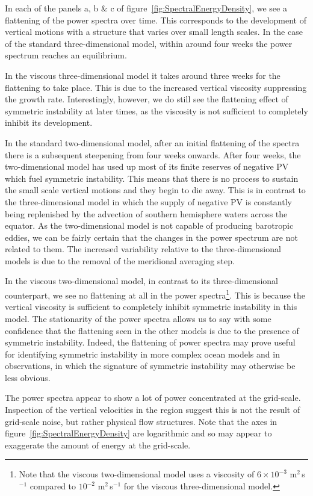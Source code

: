     In each of the panels a, b \& c of figure~\ref{fig:SpectralEnergyDensity}, we see a flattening of the power spectra over time. This corresponds to the development of vertical motions with a structure that varies over small length scales. In the case of the standard three-dimensional model, within around four weeks the power spectrum reaches an equilibrium.

    In the viscous three-dimensional model it takes around three weeks for the flattening to take place. This is due to the increased vertical viscosity suppressing the growth rate. Interestingly, however, we do still see the flattening effect of symmetric instability at later times, as the viscosity is not sufficient to completely inhibit its development.

    In the standard two-dimensional model, after an initial flattening of the spectra there is a subsequent steepening from four weeks onwards. After four weeks, the two-dimensional model has used up most of its finite reserves of negative PV which fuel symmetric instability. This means that there is no process to sustain the small scale vertical motions and they begin to die away. This is in contrast to the three-dimensional model in which the supply of negative PV is constantly being replenished by the advection of southern hemisphere waters across the equator. As the two-dimensional model is not capable of producing barotropic eddies, we can be fairly certain that the changes in the power spectrum are not related to them. The increased variability relative to the three-dimensional models is due to the removal of the meridional averaging step.

    In the viscous two-dimensional model, in contrast to its three-dimensional counterpart, we see no flattening at all in the power spectra\footnote{Note that the viscous two-dimensional model uses a viscosity of $6 \times 10^{-3}$ m$^2$\,s$^{-1}$ compared to $10^{-2}$ m$^2$\,s$^{-1}$ for the viscous three-dimensional model.}. This is because the vertical viscosity is sufficient to completely inhibit symmetric instability in this model. The stationarity of the power spectra allows us to say with some confidence that the flattening seen in the other models is due to the presence of symmetric instability. Indeed, the flattening of power spectra may prove useful for identifying symmetric instability in more complex ocean models and in observations, in which the signature of symmetric instability may otherwise be less obvious.
    
    The power spectra appear to show a lot of power concentrated at the grid-scale. Inspection of the vertical velocities in the region suggest this is not the result of grid-scale noise, but rather physical flow structures. Note that the axes in figure~\ref{fig:SpectralEnergyDensity} are logarithmic and so may appear to exaggerate the amount of energy at the grid-scale.

